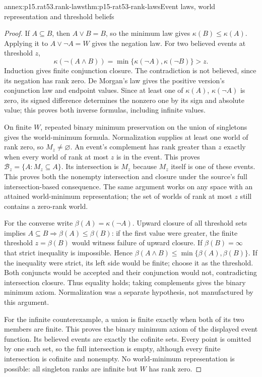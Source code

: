 \begin{annexitem}{annex:p15.rat53.rank-laws}{thm:p15-rat53-rank-laws}{Event laws, world representation and threshold beliefs}
\begin{proof}
If \(A\subseteq B\), then \(A\lor B=B\), so the minimum law gives
\(\kappa(B)\leq\kappa(A)\).  Applying it to \(A\lor\neg A=W\)
gives the negation law.  For two believed events at threshold \(z\),
\[
 \kappa(\neg(A\land B))=
 \min\{\kappa(\neg A),\kappa(\neg B)\}>z.
\]
Induction gives finite conjunction closure.  The contradiction is not
believed, since its negation has rank zero.
De Morgan's law gives the positive version's conjunction law and endpoint
values.  Since at least one of \(\kappa(A)\), \(\kappa(\neg A)\)
is zero, its signed difference determines the nonzero one by its sign and
absolute value; this proves both inverse formulas, including infinite values.

On finite \(W\), repeated binary minimum preservation on the union of
singletons gives the world-minimum formula.  Normalization supplies at
least one world of rank zero, so \(M_z\ne\varnothing\).
An event's complement has rank greater than \(z\) exactly when every
world of rank at most \(z\) is in the event.  This proves
\(\mathcal B_z=\{A:M_z\subseteq A\}\).  Its intersection is \(M_z\)
because \(M_z\) itself is one of these events.  This proves both the
nonempty intersection and closure under the source's full intersection-based
consequence.  The same argument works on any space with an attained
world-minimum representation; the set of worlds of rank at most \(z\)
still contains a zero-rank world.

For the converse write \(\beta(A)=\kappa(\neg A)\).
Upward closure of all threshold sets implies \(A\subseteq B\Rightarrow
\beta(A)\leq\beta(B)\): if the first value were greater, the finite
threshold \(z=\beta(B)\) would witness failure of upward closure.  If
\(\beta(B)=\infty\) that strict inequality is impossible.
Hence \(\beta(A\land B)\leq\min\{\beta(A),\beta(B)\}\).
If the inequality were strict, its left side would be finite; choose it
as the threshold.  Both conjuncts would be accepted and their conjunction
would not, contradicting intersection closure.  Thus equality holds;
taking complements gives the binary minimum axiom.  Normalization was a
separate hypothesis, not manufactured by this argument.

For the infinite counterexample, a union is finite exactly when both of its
two members are finite.  This proves the binary minimum axiom of the
displayed event function.  Its believed events are exactly the cofinite sets.
Every point is omitted by one such set, so the full intersection is empty,
although every finite intersection is cofinite and nonempty.  No world-minimum
representation is possible: all singleton ranks are infinite but \(W\)
has rank zero.
\end{proof}
\end{annexitem}

